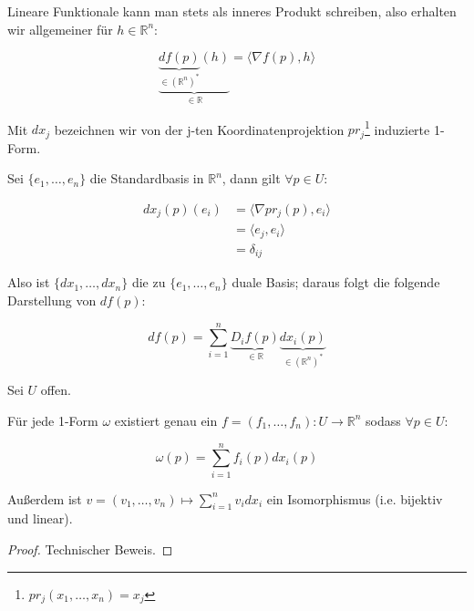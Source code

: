 \begin{remark}	
	Lineare Funktionale kann man stets als inneres Produkt schreiben, also erhalten wir allgemeiner f\"ur $h \in \mathbb R^n$:
	
	$$\underbrace{\underbrace{df(p)}_{\in (\mathbb R^n)^*}(h)}_{\in \mathbb R} = \langle \nabla f(p),h\rangle$$
\end{remark}

\begin{definition}[Basis]
	Mit $dx_j$ bezeichnen wir von der j-ten Koordinatenprojektion $pr_j$\footnote{$pr_j(x_1,\dots,x_n) = x_j$} induzierte 1-Form.
\end{definition}

\begin{remark}[Dualit\"at]
	Sei $\{e_1,\dots,e_n\}$ die Standardbasis in $\mathbb R^n$, dann gilt $\forall p \in U$:
	
	\begin{equation*}\begin{aligned}
		dx_j(p)(e_i) &= \langle \nabla pr_j(p), e_i \rangle\\
					 &= \langle e_j, e_i \rangle \\&= \delta_{ij}
	\end{aligned}\end{equation*}

	Also ist $\{dx_1,\dots,dx_n\}$ die zu $\{e_1,\dots,e_n\}$ duale Basis; daraus folgt die folgende Darstellung von $df(p)$:
	
		$$df(p) = \sum_{i=1}^n \underbrace{D_i f(p)}_{\in \mathbb R}\underbrace{dx_i(p)}_{\in (\mathbb R^n)^*}$$
\end{remark}

\begin{proposition}
	Sei $U$ offen.
	
	F\"ur jede 1-Form $\omega$ existiert genau ein $f=(f_1,\dots,f_n): U\rightarrow \mathbb R^n$ sodass $\forall p\in U$:
	
	\begin{equation}\label{eq:1formAlsKomponentenfunktionen}
		\omega(p) = \sum_{i=1}^n f_i(p) dx_i(p)
	\end{equation}

	
	Au\ss erdem ist $v=(v_1,\dots,v_n) \mapsto \sum_{i=1}^n v_i dx_i$  ein Isomorphismus (i.e. bijektiv und linear).
\end{proposition}
\begin{proof}
	Technischer Beweis.
\end{proof}

